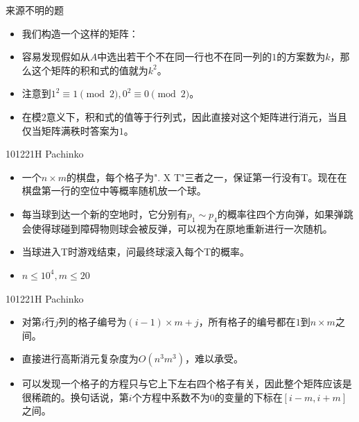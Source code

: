 \documentclass{beamer}
\begin{document}
\begin{frame}{来源不明的题}
    \begin{itemize}
        \item 我们构造一个这样的矩阵：\newline
        \begin{center}
        \end{center}
        \item 容易发现假如从$A$中选出若干个不在同一行也不在同一列的$1$的方案数为$k$，那么这个矩阵的积和式的值就为$k^2$。
        \item 注意到$1^2\equiv 1\pmod 2, 0^2\equiv 0\pmod 2$。
        \item 在模$2$意义下，积和式的值等于行列式，因此直接对这个矩阵进行消元，当且仅当矩阵满秩时答案为$1$。
    \end{itemize}
\end{frame}

\begin{frame}{101221H Pachinko}
    \begin{itemize}
        \item 一个$n\times m$的棋盘，每个格子为". X T"三者之一，保证第一行没有T。现在在棋盘第一行的空位中等概率随机放一个球。
        \item 每当球到达一个新的空地时，它分别有$p_1\sim p_4$的概率往四个方向弹，如果弹跳会使得球碰到障碍物则球会被反弹，可以视为在原地重新进行一次随机。
        \item 当球进入T时游戏结束，问最终球滚入每个T的概率。
        \item $n\leq 10^4, m\leq 20$
    \end{itemize}
\end{frame}

\begin{frame}{101221H Pachinko}
    \begin{itemize}
        \item 对第$i$行$j$列的格子编号为$(i - 1)\times m + j$，所有格子的编号都在$1$到$n\times m$之间。
        \item 直接进行高斯消元复杂度为$O(n^3m^3)$，难以承受。
        \item 可以发现一个格子的方程只与它上下左右四个格子有关，因此整个矩阵应该是很稀疏的。换句话说，第$i$个方程中系数不为$0$的变量的下标在$[i - m, i + m]$之间。
    \end{itemize}
\end{frame}
\end{document}
